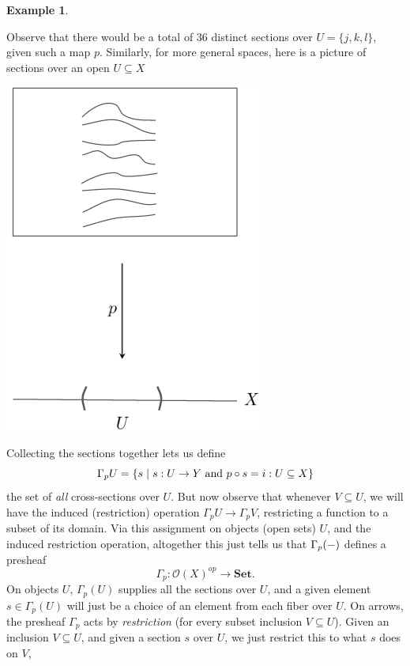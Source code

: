 \documentclass[a4paper]{book}
\theoremstyle{definition}
\newtheorem{example}{Example}[section]
\theoremstyle{definition}
\theoremstyle{definition}
\theoremstyle{theorem}
\theoremstyle{definition}
\begin{document}
\begin{example}
\begin{center}
\end{center}
Observe that there would be a total of 36 distinct sections over $U = \{j,k,l\}$, given such a map $p$. Similarly, for more general spaces, here is a picture of sections over an open $U \subseteq  X$
\begin{center}
	\includegraphics*[scale=0.25]{FunctionSections.png}
\end{center} 
Collecting the sections together lets us define 
	\begin{equation}
	\Gamma_p U = \{s \hspace*{0.3em}| \hspace*{0.3em} s: U \rightarrow Y \text{ and } p \circ s = i: U \subseteq X\}
	\end{equation}
	the set of \textit{all} cross-sections over $U$. But now observe that whenever $V \subseteq  U$, we will have the induced (restriction) operation $\Gamma_p U \rightarrow \Gamma_p V$, restricting a function to a subset of its domain. Via this assignment on objects (open sets) $U$, and the induced restriction operation, altogether this just tells us that $\Gamma_p (\--)$ defines a presheaf 
	\begin{equation*} 
	\Gamma_p: \mathscr{O}(X)^{op} \rightarrow \textbf{Set}. 
	\end{equation*}
	On objects $U$, $\Gamma_p(U)$ supplies all the sections over $U$, and a given element $s \in \Gamma_p(U)$ will just be a choice of an element from each fiber over $U$. On arrows, the presheaf $\Gamma_p$ acts by \textit{restriction} (for every subset inclusion $V \subseteq  U$). Given an inclusion $V \subseteq  U$, and given a section $s$ over $U$, we just restrict this to what $s$ does on $V$, 

\end{example}
\end{document}

